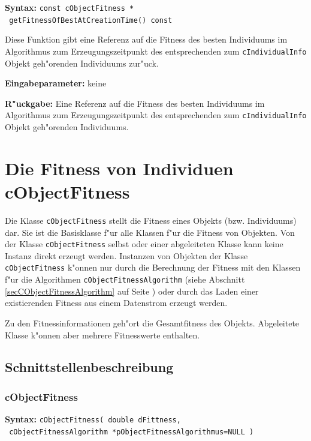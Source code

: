 \textbf{Syntax:} \verb|const cObjectFitness *| \\\verb| getFitnessOfBestAtCreationTime() const|

\bigskip\noindent
Diese Funktion gibt eine Referenz auf die Fitness des besten Individuums im Algorithmus zum Erzeugungszeitpunkt des entsprechenden zum \verb|cIndividualInfo| Objekt geh"orenden Individuums zur"uck.

\bigskip\noindent
\textbf{Eingabeparameter:} keine

\bigskip\noindent
\textbf{R"uckgabe:} Eine Referenz auf die Fitness des besten Individuums im Algorithmus zum Erzeugungszeitpunkt des entsprechenden zum \verb|cIndividualInfo| Objekt geh"orenden Individuums.



\section{Die Fitness von Individuen cObjectFitness}
\label{secCObjectFitness}

Die Klasse \verb|cObjectFitness| stellt die Fitness eines Objekts (bzw. Individuums) dar. Sie ist die Basisklasse f"ur alle Klassen f"ur die Fitness von Objekten. Von der Klasse \verb|cObjectFitness| selbst oder einer abgeleiteten Klasse kann keine Instanz direkt erzeugt werden. Instanzen von Objekten der Klasse \verb|cObjectFitness| k"onnen nur durch die Berechnung der Fitness mit den Klassen f"ur die Algorithmen \verb|cObjectFitnessAlgorithm| (siehe Abschnitt \ref{secCObjectFitnessAlgorithm} auf Seite \pageref{secCObjectFitnessAlgorithm}) oder durch das Laden einer existierenden Fitness aus einem Datenstrom erzeugt werden.

Zu den Fitnessinformationen geh"ort die Gesamtfitness des Objekts. Abgeleitete Klasse k"onnen aber mehrere Fitnesswerte enthalten.


\subsection{Schnittstellenbeschreibung}

\subsubsection{cObjectFitness}

\textbf{Syntax:} \verb|cObjectFitness( double dFittness,| \\\verb| cObjectFitnessAlgorithm *pObjectFitnessAlgorithmus=NULL )| \\


